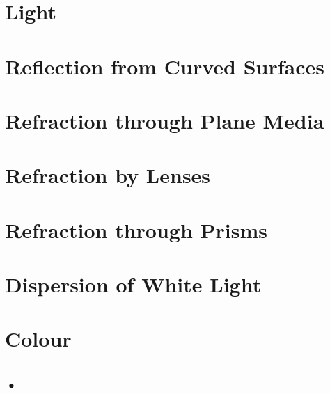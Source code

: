 \section{Light}

\begin{multicols}{2}


\section*{Reflection from Curved Surfaces}


\section*{Refraction through Plane Media}


\section*{Refraction by Lenses}


\section*{Refraction through Prisms}


\section*{Dispersion of White Light}


\section*{Colour}



\subsection{•}


\end{multicols}
